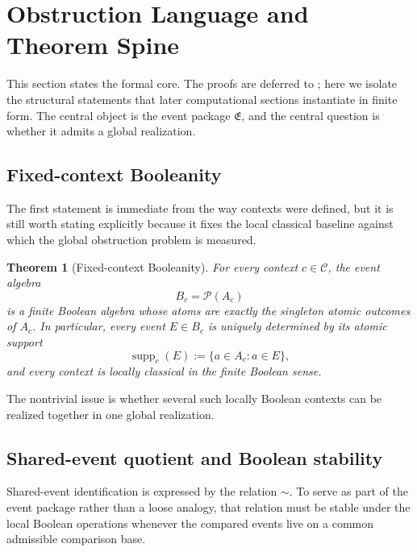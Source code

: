 \documentclass[11pt]{article}
\newcommand{\EventPackage}{\mathfrak{E}}
\newcommand{\CtxFamily}{\mathcal{C}}
\newcommand{\BoolAlg}[1]{B_{#1}}
\newcommand{\SharedEventEq}{\sim}
\newtheorem{theorem}{Theorem}[section]
\theoremstyle{definition}
\begin{document}
\section{Obstruction Language and Theorem Spine}\label{sec:theorem-spine}
This section states the formal core. The proofs are deferred to ; here we isolate the structural statements that later computational sections instantiate in finite form. The central object is the event package \(\EventPackage\), and the central question is whether it admits a global realization.

\subsection{Fixed-context Booleanity}

The first statement is immediate from the way contexts were defined, but it is still worth stating explicitly because it fixes the local classical baseline against which the global obstruction problem is measured.

\begin{theorem}[Fixed-context Booleanity]\label{thm:fixed-context-booleanity}
For every context \(c\in\CtxFamily\), the event algebra
\[
\BoolAlg{c}=\mathcal P(A_c)
\]
is a finite Boolean algebra whose atoms are exactly the singleton atomic outcomes of \(A_c\). In particular, every event \(E\in \BoolAlg{c}\) is uniquely determined by its atomic support
\[
\operatorname{supp}_c(E):=\{a\in A_c : a\in E\},
\]
and every context is locally classical in the finite Boolean sense.
\end{theorem}

The nontrivial issue is whether several such locally Boolean contexts can be realized together in one global realization.

\subsection{Shared-event quotient and Boolean stability}

Shared-event identification is expressed by the relation \(\SharedEventEq\). To serve as part of the event package rather than a loose analogy, that relation must be stable under the local Boolean operations whenever the compared events live on a common admissible comparison base.
\end{document}
